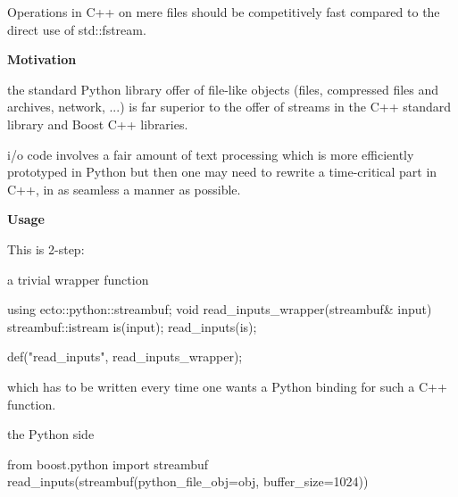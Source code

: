 \begin{DoxyItemize}
\item \-Operations in \-C++ on mere files should be competitively fast compared to the direct use of {\ttfamily std\-::fstream}.
\end{DoxyItemize}

{\bfseries \-Motivation} 


\begin{DoxyItemize}
\item the standard \-Python library offer of file-\/like objects (files, compressed files and archives, network, ...) is far superior to the offer of streams in the \-C++ standard library and \-Boost \-C++ libraries.
\end{DoxyItemize}


\begin{DoxyItemize}
\item i/o code involves a fair amount of text processing which is more efficiently prototyped in \-Python but then one may need to rewrite a time-\/critical part in \-C++, in as seamless a manner as possible.
\end{DoxyItemize}

{\bfseries \-Usage} 

\-This is 2-\/step\-:


\begin{DoxyItemize}
\item a trivial wrapper function
\end{DoxyItemize}


\begin{DoxyCode}
          using ecto::python::streambuf;
          void read_inputs_wrapper(streambuf& input)
          {
            streambuf::istream is(input);
            read_inputs(is);
          }

          def("read_inputs", read_inputs_wrapper);
\end{DoxyCode}


which has to be written every time one wants a \-Python binding for such a \-C++ function.


\begin{DoxyItemize}
\item the \-Python side
\end{DoxyItemize}


\begin{DoxyCode}
          from boost.python import streambuf
          read_inputs(streambuf(python_file_obj=obj, buffer_size=1024))
\end{DoxyCode}


